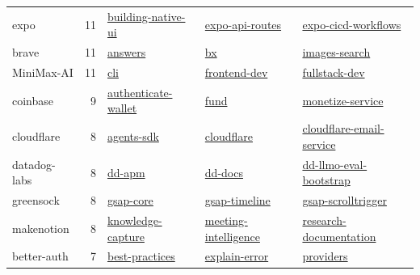 \documentclass[UTF8,a4paper,12pt]{ctexart}
\begin{document}
\begin{longtable}{p{2.8cm} r p{4.2cm} p{4.2cm} p{4.2cm}}
expo & 11 & \href{https://officialskills.sh/expo/skills/building-native-ui}{building-native-ui} & \href{https://officialskills.sh/expo/skills/expo-api-routes}{expo-api-routes} & \href{https://officialskills.sh/expo/skills/expo-cicd-workflows}{expo-cicd-workflows} \\
brave & 11 & \href{https://officialskills.sh/brave/skills/answers}{answers} & \href{https://officialskills.sh/brave/skills/bx}{bx} & \href{https://officialskills.sh/brave/skills/images-search}{images-search} \\
MiniMax-AI & 11 & \href{https://officialskills.sh/MiniMax-AI/skills/cli}{cli} & \href{https://officialskills.sh/MiniMax-AI/skills/frontend-dev}{frontend-dev} & \href{https://officialskills.sh/MiniMax-AI/skills/fullstack-dev}{fullstack-dev} \\
coinbase & 9 & \href{https://officialskills.sh/coinbase/skills/authenticate-wallet}{authenticate-wallet} & \href{https://officialskills.sh/coinbase/skills/fund}{fund} & \href{https://officialskills.sh/coinbase/skills/monetize-service}{monetize-service} \\
cloudflare & 8 & \href{https://officialskills.sh/cloudflare/skills/agents-sdk}{agents-sdk} & \href{https://officialskills.sh/cloudflare/skills/cloudflare}{cloudflare} & \href{https://officialskills.sh/cloudflare/skills/cloudflare-email-service}{cloudflare-email-service} \\
datadog-labs & 8 & \href{https://officialskills.sh/datadog-labs/skills/dd-apm}{dd-apm} & \href{https://officialskills.sh/datadog-labs/skills/dd-docs}{dd-docs} & \href{https://officialskills.sh/datadog-labs/skills/dd-llmo-eval-bootstrap}{dd-llmo-eval-bootstrap} \\
greensock & 8 & \href{https://officialskills.sh/greensock/skills/gsap-core}{gsap-core} & \href{https://officialskills.sh/greensock/skills/gsap-timeline}{gsap-timeline} & \href{https://officialskills.sh/greensock/skills/gsap-scrolltrigger}{gsap-scrolltrigger} \\
makenotion & 8 & \href{https://officialskills.sh/makenotion/skills/knowledge-capture}{knowledge-capture} & \href{https://officialskills.sh/makenotion/skills/meeting-intelligence}{meeting-intelligence} & \href{https://officialskills.sh/makenotion/skills/research-documentation}{research-documentation} \\
better-auth & 7 & \href{https://officialskills.sh/better-auth/skills/best-practices}{best-practices} & \href{https://officialskills.sh/better-auth/skills/explain-error}{explain-error} & \href{https://officialskills.sh/better-auth/skills/providers}{providers} \\

\end{longtable}
\end{document}

